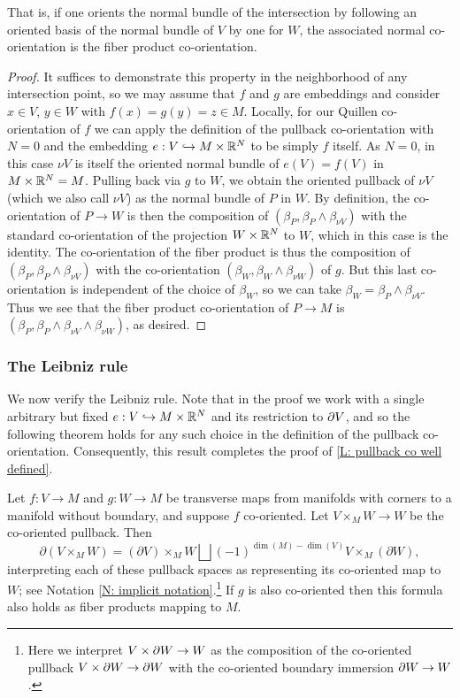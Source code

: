 That is, if one orients the normal bundle of the intersection by following an oriented basis of the normal bundle of $V$ by one for $W$,
the associated normal co-orientation is the fiber product co-orientation.

\begin{proof}
It suffices to demonstrate this property in the neighborhood of any intersection point, so we may assume that $f$ and $g$ are embeddings and consider $x\in V$, $y\in W$ with $f(x)=g(y)=z\in M$. Locally, for our Quillen co-orientation of $f$ we can apply the definition of the pullback co-orientation with  $N=0$ and the embedding $e:V\hookrightarrow M\times \mathbb{R}^N$ to be simply $f$ itself. 
As $N=0$, in this case $\nu V$ is itself the oriented normal bundle of $e(V)=f(V)$ in  $M\times \mathbb{R}^N=M$. Pulling back via $g$ to $W$, we obtain the oriented pullback of $\nu V$ (which we also call $\nu V$) as the normal bundle of $P$ in $W$. By definition, the co-orientation of $P\to W$ is then the composition of $(\beta_P,\beta_P\wedge \beta_{\nu V})$ with the standard co-orientation of the projection $W\times \mathbb{R}^N$ to $W$, which in this case is the identity. The co-orientation of the fiber product is thus the composition of $(\beta_P,\beta_P\wedge \beta_{\nu V})$ with the co-orientation $(\beta_W,\beta_W\wedge \beta_{\nu W})$  of $g$. But this last co-orientation is independent of the choice of $\beta_W$, so we can take $\beta_W=\beta_P\wedge \beta_{\nu V}$. Thus we see that the fiber product co-orientation of $P\to M$ is $(\beta_P, \beta_P\wedge \beta_{\nu V}\wedge \beta_{\nu W})$, as desired.
\end{proof}






\subsubsection{The Leibniz rule} We  now verify  the Leibniz rule. Note that in the proof we work with a single arbitrary but fixed $e:V\hookrightarrow M\times \mathbb{R}^N$ and its restriction to $\partial V$, and so the following theorem holds for any such choice in the definition of the pullback co-orientation. Consequently,  this result completes the proof of \cref{L: pullback co well defined}.



\begin{proposition}\label{leibniz}
Let $f:V\to M$ and $g:W\to M$ be transverse maps from manifolds with corners to a manifold without boundary, and suppose $f$ co-oriented. Let $V \times_M W\to W$ be the co-oriented pullback.  Then 
$$\partial (V \times_M W) = (\partial V) \times_M W \bigsqcup (-1)^{\dim(M)-\dim(V)} V \times_M (\partial W),$$
interpreting each of these pullback spaces as representing its co-oriented map to $W$; see Notation \ref{N: implicit notation}.\footnote{Here we interpret $V\times\partial W\to W$ as the composition of the co-oriented pullback $V\times\partial W\to \partial W$ with the co-oriented boundary immersion $\partial W\to W$.} If $g$ is also co-oriented then this formula also holds as fiber products mapping to $M$. 
\end{proposition}

